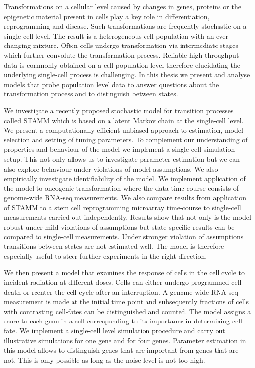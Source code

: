 \vspace{-1.5cm}
Transformations on a cellular level caused by changes in genes, proteins or the epigenetic material present in cells play a key role in differentiation, reprogramming and disease. Such transformations are frequently stochastic on a single-cell level. The result is a heterogeneous cell population with an ever changing mixture. Often cells undergo transformation via intermediate stages which further  convolute the transformation process. Reliable high-throughput data is commonly obtained on a cell population level therefore elucidating the underlying single-cell process is challenging. In this thesis we present and analyse models that probe population level data to answer questions about the transformation process and to distinguish between states. 

We investigate a recently proposed stochastic model for transition processes called STAMM which is based on a latent Markov chain at the single-cell level. We present a computationally efficient unbiased approach to estimation, model selection and setting of tuning parameters. To complement our understanding of properties and behaviour of the model we implement a single-cell simulation setup. This not only allows us to investigate parameter estimation but we can also explore behaviour under violations of model assumptions. We also empirically investigate identifiability of the model. We implement application of the model to oncogenic transformation where the data time-course consists of genome-wide RNA-seq measurements. We also compare results from application of STAMM to a stem cell reprogramming microarray time-course to single-cell measurements carried out independently. Results show that not only is the model robust under mild violations of assumptions but state specific results can be compared to single-cell measurements. Under stronger violation of assumptions transitions between states are not estimated well. The model is therefore especially useful to steer further experiments in the right direction.

We then present  a model that examines the response of cells in the cell cycle to incident radiation at different doses. Cells can either undergo programmed cell death or reenter the cell cycle after an interruption. A genome-wide RNA-seq measurement is made at the initial time point and subsequently fractions of cells with contrasting cell-fates can be distinguished and counted. The model assigns a score to each gene in a cell corresponding to its importance in determining cell fate. We implement a single-cell level simulation procedure and carry out illustrative simulations for one gene and for four genes. Parameter estimation in this model allows to distinguish genes that are important from genes that are not. This is only possible as long as the noise level is not too high. 


